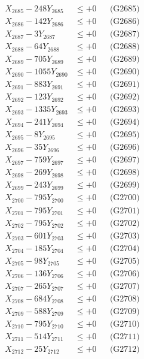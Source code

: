 \documentclass[a4paper,10pt]{article}
\begin{document}
{\begin{align}
X_{2685} - 248Y_{2685} &\leq +0 && \text{(G2685)} \\
X_{2686} - 142Y_{2686} &\leq +0 && \text{(G2686)} \\
X_{2687} - 3Y_{2687} &\leq +0 && \text{(G2687)} \\
X_{2688} - 64Y_{2688} &\leq +0 && \text{(G2688)} \\
X_{2689} - 705Y_{2689} &\leq +0 && \text{(G2689)} \\
X_{2690} - 1055Y_{2690} &\leq +0 && \text{(G2690)} \\
\allowbreak
X_{2691} - 883Y_{2691} &\leq +0 && \text{(G2691)} \\
X_{2692} - 123Y_{2692} &\leq +0 && \text{(G2692)} \\
X_{2693} - 1335Y_{2693} &\leq +0 && \text{(G2693)} \\
X_{2694} - 241Y_{2694} &\leq +0 && \text{(G2694)} \\
X_{2695} - 8Y_{2695} &\leq +0 && \text{(G2695)} \\
X_{2696} - 35Y_{2696} &\leq +0 && \text{(G2696)} \\
X_{2697} - 759Y_{2697} &\leq +0 && \text{(G2697)} \\
X_{2698} - 269Y_{2698} &\leq +0 && \text{(G2698)} \\
X_{2699} - 243Y_{2699} &\leq +0 && \text{(G2699)} \\
X_{2700} - 795Y_{2700} &\leq +0 && \text{(G2700)} \\
\allowbreak
X_{2701} - 795Y_{2701} &\leq +0 && \text{(G2701)} \\
X_{2702} - 795Y_{2702} &\leq +0 && \text{(G2702)} \\
X_{2703} - 601Y_{2703} &\leq +0 && \text{(G2703)} \\
X_{2704} - 185Y_{2704} &\leq +0 && \text{(G2704)} \\
X_{2705} - 98Y_{2705} &\leq +0 && \text{(G2705)} \\
X_{2706} - 136Y_{2706} &\leq +0 && \text{(G2706)} \\
X_{2707} - 265Y_{2707} &\leq +0 && \text{(G2707)} \\
X_{2708} - 684Y_{2708} &\leq +0 && \text{(G2708)} \\
X_{2709} - 588Y_{2709} &\leq +0 && \text{(G2709)} \\
X_{2710} - 795Y_{2710} &\leq +0 && \text{(G2710)} \\
\allowbreak
X_{2711} - 514Y_{2711} &\leq +0 && \text{(G2711)} \\
X_{2712} - 25Y_{2712} &\leq +0 && \text{(G2712)} \\

\end{align}}
\end{document}
